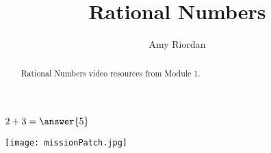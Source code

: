 \documentclass{ximera}
\title{Rational Numbers}
\author{Amy Riordan}
\begin{document}
\begin{abstract}
Rational Numbers video resources from Module 1.
\end{abstract}
\maketitle


\begin{exercise}
    $2+3=\answer{5}$
\end{exercise}

\begin{image} %
    \texttt{[image: missionPatch.jpg]}  %
\end{image}
\end{document}

